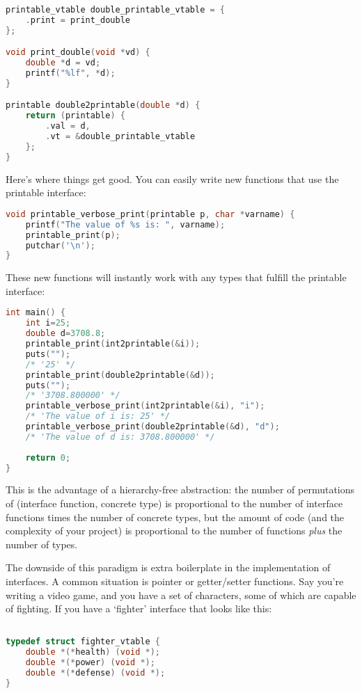 \documentclass[12pt]{article}
\begin{document}
\begin{lstlisting}[language=C]
printable_vtable double_printable_vtable = {
    .print = print_double
};

void print_double(void *vd) {
    double *d = vd;
    printf("%lf", *d);
}

printable double2printable(double *d) {
    return (printable) {
        .val = d,
        .vt = &double_printable_vtable
    };
}
\end{lstlisting}

Here's where things get good. You can easily write new functions that use the printable interface:

\begin{lstlisting}[language=C]
void printable_verbose_print(printable p, char *varname) {
    printf("The value of %s is: ", varname);
    printable_print(p);
    putchar('\n');
}
\end{lstlisting}

These new functions will instantly work with
any types that fulfill the printable interface:

\begin{lstlisting}[language=C]
int main() {
    int i=25;
    double d=3708.8;
    printable_print(int2printable(&i));
    puts("");
    /* '25' */
    printable_print(double2printable(&d));
    puts("");
    /* '3708.800000' */
    printable_verbose_print(int2printable(&i), "i");
    /* 'The value of i is: 25' */
    printable_verbose_print(double2printable(&d), "d");
    /* 'The value of d is: 3708.800000' */
    
    return 0;
}
\end{lstlisting}

This is the advantage of a hierarchy-free abstraction: the number of
permutations of (interface function, concrete type) is proportional to 
the number of interface functions times the number of concrete types,
but the amount of code (and the complexity of your project) is proportional
to the number of functions \textit{plus} the number of types.

The downside of this paradigm is extra boilerplate in the implementation of interfaces.
A common situation is pointer or getter/setter functions. Say you're writing a video game,
and you have a set of characters, some of which are capable of fighting. If you have a `fighter'
interface that looks like this:

\begin{lstlisting}[language=C]

typedef struct fighter_vtable {
    double *(*health) (void *);
    double *(*power) (void *);
    double *(*defense) (void *);
}

\end{lstlisting}
\end{document}
